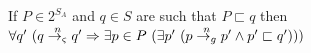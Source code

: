 \begin{corollary}
If $P \in 2^{S_\mathit{A}}$ and $q \in S$ are such that $P \sqsubset q$ then
$\forall q^\prime\ (q \stackrel{n}{\rightarrow_{\varsigma}} q^\prime \Rightarrow \exists p \in P\ (\exists p^\prime\ (p \stackrel{n}{\rightarrow_{g}} p^\prime \wedge p^\prime \sqsubset q^\prime)))$
\end{corollary}

